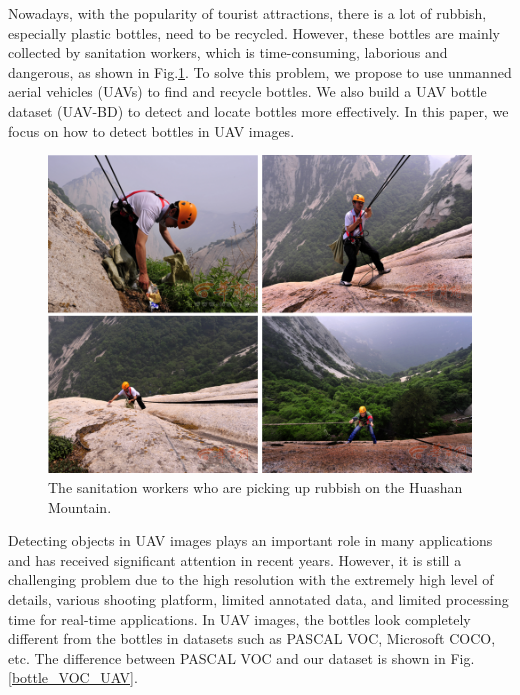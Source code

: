\label{sec:intro}


Nowadays, with the popularity of tourist attractions, there is a lot of rubbish, especially plastic bottles, need to be recycled. However, these bottles are mainly collected by sanitation workers, which is time-consuming, laborious and dangerous, as shown in Fig.\ref{fig:sanitation_worker}. To solve this problem, we propose to use unmanned aerial vehicles (UAVs) to find and recycle bottles. We also build a UAV bottle dataset (UAV-BD) to detect and locate bottles more effectively. In this paper, we focus on how to detect bottles in UAV images.


\begin{figure}
	\includegraphics[width=\linewidth]{images/sanitation_worker.png}
	\caption{The sanitation workers who are picking up rubbish on the Huashan Mountain\protect\footnotemark.}
	\label{fig:sanitation_worker}
\end{figure}





Detecting objects in UAV images plays an important role in many applications and has received significant attention in recent years\cite{UAV2}. However, it is still a challenging problem due to the high resolution with the extremely high level of details, various shooting platform, limited annotated data, and limited processing time for real-time applications\cite{car_detection}. In UAV images, the bottles look completely different from the bottles in datasets such as PASCAL VOC\cite{PASCALVOC}, Microsoft COCO\cite{COCO}, etc. The difference between PASCAL VOC and our dataset is shown in Fig.\ref{bottle_VOC_UAV}.


